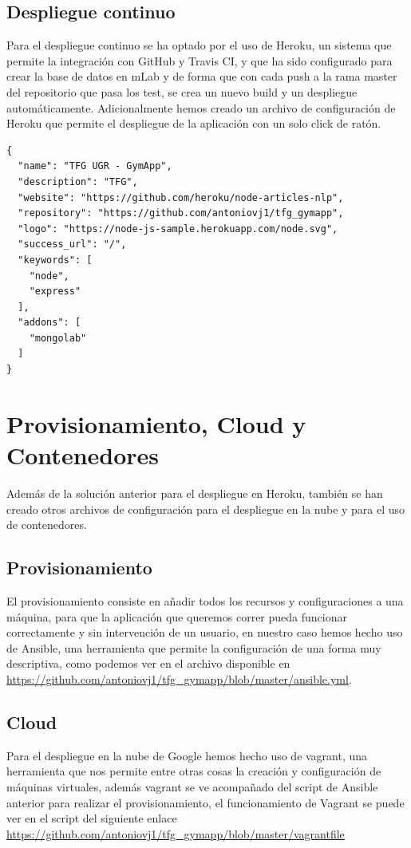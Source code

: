 \subsection {Despliegue continuo}
Para el despliegue continuo se ha optado por el uso de Heroku, un sistema que permite la integración con GitHub y Travis CI, y que ha sido configurado para crear la base de datos en mLab y de forma que con cada push a la rama master del repositorio que pasa los test, se crea un nuevo build y un despliegue automáticamente. Adicionalmente hemos creado un archivo de configuración de Heroku que permite el despliegue de la aplicación con un solo click de ratón.
\begin{lstlisting}
{
  "name": "TFG UGR - GymApp",
  "description": "TFG",
  "website": "https://github.com/heroku/node-articles-nlp",
  "repository": "https://github.com/antoniovj1/tfg_gymapp",
  "logo": "https://node-js-sample.herokuapp.com/node.svg",
  "success_url": "/",
  "keywords": [
    "node",
    "express"
  ],
  "addons": [
    "mongolab"
  ]
}
\end{lstlisting}
\section {Provisionamiento, Cloud y Contenedores}
Además de la solución anterior para el despliegue en Heroku, también se han creado otros archivos de configuración para el despliegue en la nube y para el uso de contenedores.

\subsection {Provisionamiento}
El provisionamiento consiste en añadir todos los recursos y configuraciones a una máquina, para que la aplicación que queremos correr pueda funcionar correctamente y sin intervención de un usuario, en nuestro caso hemos hecho uso de Ansible, una herramienta que permite la configuración de una forma muy descriptiva, como podemos ver en el archivo disponible en \url{https://github.com/antoniovj1/tfg_gymapp/blob/master/ansible.yml}.

\subsection {Cloud}
Para el despliegue en la nube de Google hemos hecho uso de vagrant, una herramienta que nos permite entre otras cosas la creación y configuración de máquinas virtuales, además vagrant se ve acompañado del script de Ansible anterior para realizar el provisionamiento, el funcionamiento de Vagrant se puede ver en el script del siguiente enlace \url{https://github.com/antoniovj1/tfg_gymapp/blob/master/vagrantfile}



